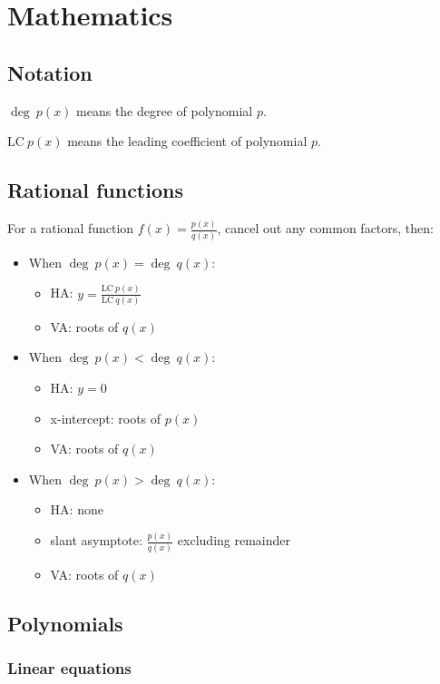 \chapter{Mathematics}

\section{Notation}

$\deg~p(x)$ means the degree of polynomial $p$.

$\text{LC}~p(x)$ means the leading coefficient of polynomial $p$.

\section{Rational functions}

For a rational function $f(x) = \frac{p(x)}{q(x)}$, cancel out any common factors, then:

\begin{itemize}
	\item When $\deg~p(x) = \deg~q(x)$:
	\begin{itemize}
		\item HA: $y = \frac{\text{LC}~p(x)}{\text{LC}~q(x)}$
		\item VA: roots of $q(x)$
	\end{itemize}
	\item When $\deg~p(x) < \deg~q(x)$:
	\begin{itemize}
		\item HA: $y = 0$
		\item x-intercept: roots of $p(x)$
		\item VA: roots of $q(x)$
	\end{itemize}
	\item When $\deg~p(x) > \deg~q(x)$:
	\begin{itemize}
		\item HA: none
		\item slant asymptote: $\frac{p(x)}{q(x)}$ excluding remainder
		\item VA: roots of $q(x)$
	\end{itemize}
\end{itemize}

\section{Polynomials}

\subsection{Linear equations}

